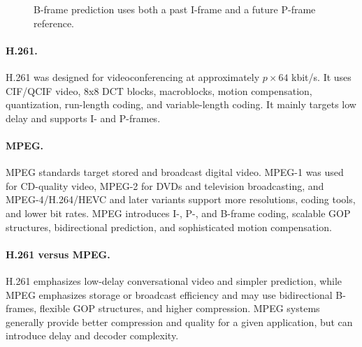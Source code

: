 \documentclass[12pt,a4paper]{article}
\newcommand{\topic}[1]{\paragraph{\color{navy}#1.}}
\begin{document}
\begin{figure}[htbp]
\centering
{}
\caption{B-frame prediction uses both a past I-frame and a future P-frame reference.}
\label{fig:ipb-reference}
\end{figure}

\topic{H.261}
H.261 was designed for videoconferencing at approximately \(p\times64\) kbit/s. It uses CIF/QCIF video, 8x8 DCT blocks, macroblocks, motion compensation, quantization, run-length coding, and variable-length coding. It mainly targets low delay and supports I- and P-frames.

\topic{MPEG}
MPEG standards target stored and broadcast digital video. MPEG-1 was used for CD-quality video, MPEG-2 for DVDs and television broadcasting, and MPEG-4/H.264/HEVC and later variants support more resolutions, coding tools, and lower bit rates. MPEG introduces I-, P-, and B-frame coding, scalable GOP structures, bidirectional prediction, and sophisticated motion compensation.

\topic{H.261 versus MPEG}
H.261 emphasizes low-delay conversational video and simpler prediction, while MPEG emphasizes storage or broadcast efficiency and may use bidirectional B-frames, flexible GOP structures, and higher compression. MPEG systems generally provide better compression and quality for a given application, but can introduce delay and decoder complexity.
\end{document}
